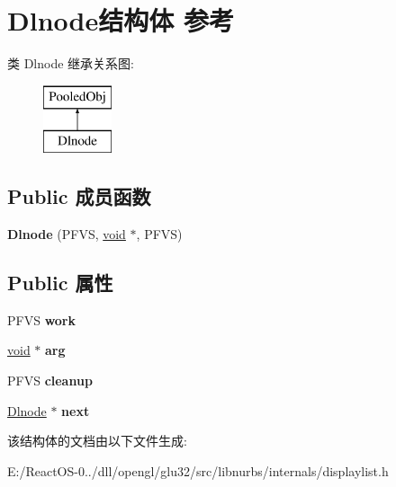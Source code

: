 \hypertarget{struct_dlnode}{}\section{Dlnode结构体 参考}
\label{struct_dlnode}
类 Dlnode 继承关系图\+:\begin{figure}[H]
\begin{center}
\leavevmode
\includegraphics[height=2.000000cm]{struct_dlnode}
\end{center}
\end{figure}
\subsection*{Public 成员函数}
\begin{DoxyCompactItemize}
\item 
\mbox{\label{struct_dlnode_a39084e9fc24bf9435dce97f3fe6d162f}} 
{\bfseries Dlnode} (P\+F\+VS, \hyperlink{interfacevoid}{void} $\ast$, P\+F\+VS)
\end{DoxyCompactItemize}
\subsection*{Public 属性}
\begin{DoxyCompactItemize}
\item 
\mbox{\label{struct_dlnode_a50e3dbc43f70efe02a43995930a41f74}} 
P\+F\+VS {\bfseries work}
\item 
\mbox{\label{struct_dlnode_aa887bc5217dc1cf74858891b686dae99}} 
\hyperlink{interfacevoid}{void} $\ast$ {\bfseries arg}
\item 
\mbox{\label{struct_dlnode_ab35645d8e16fbde98462e3aa2d7a2c28}} 
P\+F\+VS {\bfseries cleanup}
\item 
\mbox{\label{struct_dlnode_ad8204075dcee08a9e08e24f0ea3a8af0}} 
\hyperlink{struct_dlnode}{Dlnode} $\ast$ {\bfseries next}
\end{DoxyCompactItemize}


该结构体的文档由以下文件生成\+:\begin{DoxyCompactItemize}
\item 
E\+:/\+React\+O\+S-\/0../dll/opengl/glu32/src/libnurbs/internals/displaylist.\+h\end{DoxyCompactItemize}
